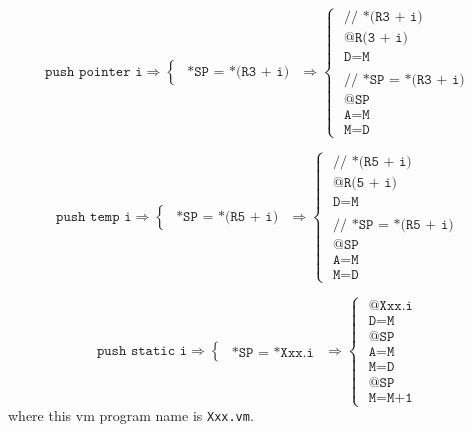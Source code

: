 \documentclass[a4paper]{book}
\begin{document}
\[
    \texttt{push pointer i}
    \Rightarrow
    \begin{cases}
        \texttt{ *SP = *(R3 + i) }
    \end{cases}
    \Rightarrow
    \begin{cases}
        \texttt{ // *(R3 + i)       } \\
        \texttt{ @R(3 + i)          } \\
        \texttt{ D=M                } \\
        \\
        \texttt{ // *SP = *(R3 + i) } \\
        \texttt{ @SP                } \\
        \texttt{ A=M                } \\
        \texttt{ M=D                }
    \end{cases}
\]

\[
    \texttt{push temp i}
    \Rightarrow
    \begin{cases}
        \texttt{ *SP = *(R5 + i) }
    \end{cases}
    \Rightarrow
    \begin{cases}
        \texttt{ // *(R5 + i)       } \\
        \texttt{ @R(5 + i)          } \\
        \texttt{ D=M                } \\
        \\
        \texttt{ // *SP = *(R5 + i) } \\
        \texttt{ @SP                } \\
        \texttt{ A=M                } \\
        \texttt{ M=D                }
    \end{cases}
\]

\[
    \texttt{push static i}
    \Rightarrow
    \begin{cases}
        \texttt{ *SP = *Xxx.i }
    \end{cases}
    \Rightarrow
    \begin{cases}
        \texttt{ @Xxx.i } \\
        \texttt{ D=M    } \\
        \texttt{ @SP    } \\
        \texttt{ A=M    } \\
        \texttt{ M=D    } \\
        \texttt{ @SP    } \\
        \texttt{ M=M+1  }
    \end{cases}
\]
where this vm program name is \texttt{Xxx.vm}.
\end{document}
